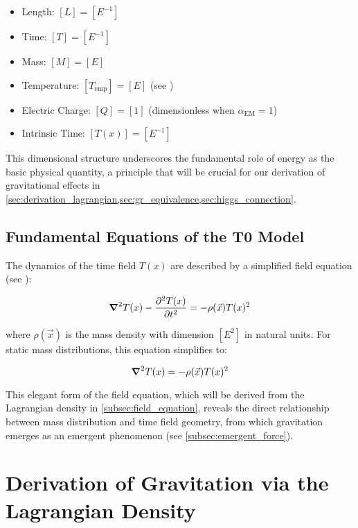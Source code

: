 \documentclass[12pt,a4paper]{article}
\newcommand{\Tfield}{T(x)}
\newcommand{\alphaEM}{\alpha_{\text{EM}}}
\newcommand{\vecx}{\vec{x}}
\begin{document}
	\begin{itemize}
		\item Length: $[L] = [E^{-1}]$
		\item Time: $[T] = [E^{-1}]$
		\item Mass: $[M] = [E]$
		\item Temperature: $[T_{\text{emp}}] = [E]$ (see \cite{pascher_temp_2025})
		\item Electric Charge: $[Q] = [1]$ (dimensionless when $\alphaEM = 1$)
		\item Intrinsic Time: $[\Tfield] = [E^{-1}]$
	\end{itemize}
	
	This dimensional structure underscores the fundamental role of energy as the basic physical quantity, a principle that will be crucial for our derivation of gravitational effects in \cref{sec:derivation_lagrangian,sec:gr_equivalence,sec:higgs_connection}.
	
	\subsection{Fundamental Equations of the T0 Model}
	\label{subsec:fundamental_equations}
	The dynamics of the time field \(\Tfield\) are described by a simplified field equation (see \cite{pascher_lagrange_2025,pascher_higgs_2025}):
	
	\begin{equation}
		\label{eq:time_field_dynamic}
		\grad^2 \Tfield - \frac{\partial^2 \Tfield}{\partial t^2} = -\rho(\vecx) \Tfield^2
	\end{equation}
	
	where \(\rho(\vecx)\) is the mass density with dimension \([E^2]\) in natural units. For static mass distributions, this equation simplifies to:
	
	\begin{equation}
		\label{eq:time_field_static}
		\grad^2 \Tfield = -\rho(\vecx) \Tfield^2
	\end{equation}
	
	This elegant form of the field equation, which will be derived from the Lagrangian density in \cref{subsec:field_equation}, reveals the direct relationship between mass distribution and time field geometry, from which gravitation emerges as an emergent phenomenon (see \cref{subsec:emergent_force}).
	
	\section{Derivation of Gravitation via the Lagrangian Density}
	\label{sec:derivation_lagrangian}
	
\end{document}
